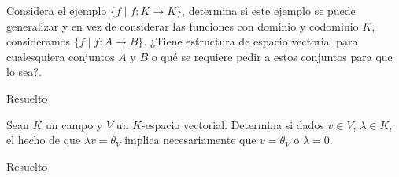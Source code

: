 \begin{exercise}{}{}
    Considera el ejemplo $\{f  \mid f:K \rightarrow K\}$, determina si este ejemplo se puede generalizar y en vez de considerar las funciones con dominio y codominio $K$, consideramos $\{f \mid f: A \rightarrow B\}$. ¿Tiene estructura de espacio vectorial para cualesquiera conjuntos $A$ y $B$ o qué se requiere pedir a estos conjuntos para que lo sea?.
\begin{solution}{}{}
Resuelto
\end{solution}
\end{exercise}

\begin{exercise}{}{}
    Sean $K$ un campo y $V$ un $K$-espacio vectorial. Determina si dados $v \in V$, $ \lambda \in K$, el hecho de que $ \lambda v = \theta_V$ implica necesariamente que $v = \theta_V$ o $ \lambda = 0$.
\begin{solution}{}{}
Resuelto
\end{solution}
\end{exercise}




